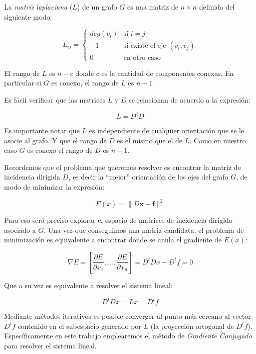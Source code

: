 \documentclass[conference,compsoc,a4paper]{IEEEtran}
\begin{document}
\bigskip


La \textit{matriz laplaciana} ($L$) de un grafo $G$ es una matriz de 
$n \times n$ definida del siguiente modo:

$$
	L_{ij} =
	\begin{cases}
	deg(v_i) & \text{si $i = j$} \\
	-1 & \text{si existe el eje $(v_i,v_j)$} \\
	0 & \text{en otro caso} 
	\end{cases}
$$

El rango de $L$ es $n-c$ donde $c$ es la cantidad de componentes 
conexas. En particular si $G$ es conexo, el rango de $L$ es $n-1$

\bigskip


Es fácil verificar que las matrices $L$ y $D$ se relacionan de acuerdo
a la expresión:

$$L = D^t D$$

Es importante notar que $L$ es independiente de cualquier orientación 
que se le asocie al grafo. Y que el rango de $D$ es el mismo que el de 
$L$. Como en nuestro caso $G$ es conexo el rango de $D$ es $n-1$.

\bigskip


Recordemos que el problema que queremos resolver es encontrar la matriz 
de incidencia dirigida $D$, es decir la ``mejor'' 
orientación de los ejes 
del grafo $G$, de modo de minimizar la expresión:

$$E(x) = \|D\bm{x}-\bm{f}\|^2$$

Para eso será preciso explorar el espacio de matrices de 
incidencia dirigida asociado a $G$. Una vez que conseguimos una 
matriz candidata, el problema de minimización es equivalente a encontrar
dónde se anula el gradiente de $E(x)$:
 
$$\nabla E = \left[\frac{\partial E}{\partial x_1}, \dots, \frac{\partial 
E}{\partial x_n}\right] = D^tDx-D^tf=0$$

\noindent Que a su vez es equivalente a resolver el sistema lineal:

$$D^tDx = Lx = D^tf$$

Mediante métodos iterativos es posible converger al punto más cercano 
al vector $D^tf$ contenido en el subespacio generado por $L$ (la 
proyección ortogonal de $D^tf$). Específicamente en este trabajo 
emplearemos el método de \textit{Gradiente Conjugado} \cite{Saad:2007} 
para resolver el sistema lineal.
\end{document}
